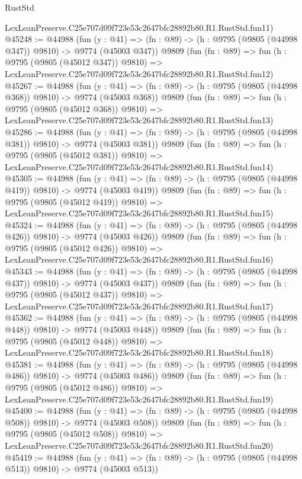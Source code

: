 \begin{lexlean}{RustStd}
\begin{coremodule}
    LexLeanPreserve.C25e707d09f723e53c2647bfc28892b80.R1.RustStd.fun11)
@45248 := @44988
    (fun (y : @41) => (fn : @89) -> (h : @9795 (@9805 (@44998 @347)) @9810) -> @9774 (@45003 @347))
    @9809
    (fun (fn : @89) =>
    fun (h : @9795 (@9805 (@45012 @347)) @9810) =>
    LexLeanPreserve.C25e707d09f723e53c2647bfc28892b80.R1.RustStd.fun12)
@45267 := @44988
    (fun (y : @41) => (fn : @89) -> (h : @9795 (@9805 (@44998 @368)) @9810) -> @9774 (@45003 @368))
    @9809
    (fun (fn : @89) =>
    fun (h : @9795 (@9805 (@45012 @368)) @9810) =>
    LexLeanPreserve.C25e707d09f723e53c2647bfc28892b80.R1.RustStd.fun13)
@45286 := @44988
    (fun (y : @41) => (fn : @89) -> (h : @9795 (@9805 (@44998 @381)) @9810) -> @9774 (@45003 @381))
    @9809
    (fun (fn : @89) =>
    fun (h : @9795 (@9805 (@45012 @381)) @9810) =>
    LexLeanPreserve.C25e707d09f723e53c2647bfc28892b80.R1.RustStd.fun14)
@45305 := @44988
    (fun (y : @41) => (fn : @89) -> (h : @9795 (@9805 (@44998 @419)) @9810) -> @9774 (@45003 @419))
    @9809
    (fun (fn : @89) =>
    fun (h : @9795 (@9805 (@45012 @419)) @9810) =>
    LexLeanPreserve.C25e707d09f723e53c2647bfc28892b80.R1.RustStd.fun15)
@45324 := @44988
    (fun (y : @41) => (fn : @89) -> (h : @9795 (@9805 (@44998 @426)) @9810) -> @9774 (@45003 @426))
    @9809
    (fun (fn : @89) =>
    fun (h : @9795 (@9805 (@45012 @426)) @9810) =>
    LexLeanPreserve.C25e707d09f723e53c2647bfc28892b80.R1.RustStd.fun16)
@45343 := @44988
    (fun (y : @41) => (fn : @89) -> (h : @9795 (@9805 (@44998 @437)) @9810) -> @9774 (@45003 @437))
    @9809
    (fun (fn : @89) =>
    fun (h : @9795 (@9805 (@45012 @437)) @9810) =>
    LexLeanPreserve.C25e707d09f723e53c2647bfc28892b80.R1.RustStd.fun17)
@45362 := @44988
    (fun (y : @41) => (fn : @89) -> (h : @9795 (@9805 (@44998 @448)) @9810) -> @9774 (@45003 @448))
    @9809
    (fun (fn : @89) =>
    fun (h : @9795 (@9805 (@45012 @448)) @9810) =>
    LexLeanPreserve.C25e707d09f723e53c2647bfc28892b80.R1.RustStd.fun18)
@45381 := @44988
    (fun (y : @41) => (fn : @89) -> (h : @9795 (@9805 (@44998 @486)) @9810) -> @9774 (@45003 @486))
    @9809
    (fun (fn : @89) =>
    fun (h : @9795 (@9805 (@45012 @486)) @9810) =>
    LexLeanPreserve.C25e707d09f723e53c2647bfc28892b80.R1.RustStd.fun19)
@45400 := @44988
    (fun (y : @41) => (fn : @89) -> (h : @9795 (@9805 (@44998 @508)) @9810) -> @9774 (@45003 @508))
    @9809
    (fun (fn : @89) =>
    fun (h : @9795 (@9805 (@45012 @508)) @9810) =>
    LexLeanPreserve.C25e707d09f723e53c2647bfc28892b80.R1.RustStd.fun20)
@45419 := @44988
    (fun (y : @41) => (fn : @89) -> (h : @9795 (@9805 (@44998 @513)) @9810) -> @9774 (@45003 @513))

\end{coremodule}
\end{lexlean}
